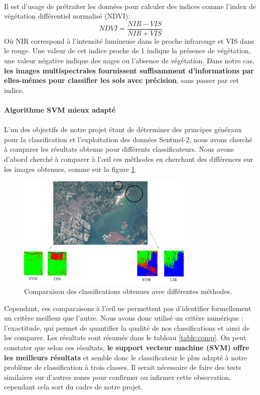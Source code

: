 \documentclass[a4paper,10pt]{article}
\begin{document}
\paragraph{}
Il est d'usage de prétraiter les données pour calculer des indices comme l'index de végétation différentiel normalisé (NDVI)\cite{NDVI}:
\begin{equation}
NDVI=\frac{NIR-VIS}{NIR+VIS}
\end{equation}
Où NIR correspond à l'intensité lumineuse dans le proche infrarouge et VIS dans le rouge. Une valeur de cet indice proche de 1 indique la présence de végétation, une valeur négative indique des nages ou l'absence de végétation. 
Dans notre cas, \textbf{les images multispectrales fournissent suffisamment d'informations par elles-mêmes pour classifier les sols avec précision}, sans passer par cet indice.

\paragraph{Algorithme SVM mieux adapté}
\paragraph{}
L'un des objectifs de notre projet étant de déterminer des principes généraux pour la classification et l'exploitation des données Sentinel-2, nous avons cherché à comparer les résultats obtenus pour différents classificateurs. Nous avons d'abord cherché à comparer à l'œil ces méthodes en cherchant des différences sur les images obtenues, comme sur la figure \ref{fig:comparaison}.

\begin{figure}[H]
  \centering
    \includegraphics[width=0.75\textwidth]{comparaison}
  \caption{Comparaison des classifications obtenues avec différentes méthodes.}
  \label{fig:comparaison}
\end{figure}
Cependant, ces comparaisons à l'œil ne permettent pas d'identifier formellement un critère meilleur que l'autre. Nous avons donc utilisé un critère numérique : l'exactitude, qui permet de quantifier la qualité de nos classifications et ainsi de les comparer. Les résultats sont résumés dans le tableau \ref{table:comp}. On peut constater que selon ces résultats, \textbf{le support vecteur machine (SVM) offre les meilleurs résultats} et semble donc le classificateur le plus adapté à notre problème de classification à trois classes. Il serait nécessaire de faire des tests similaires sur d'autres zones pour confirmer ou infirmer cette observation, cependant cela sort du cadre de notre projet.
\end{document}
